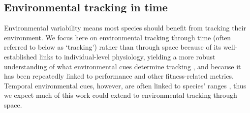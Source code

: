 \documentclass[11pt,letterpaper]{article}
\begin{document}

\subsection{Environmental tracking in time}

Environmental variability means most species should benefit from tracking their environment. We focus here on environmental tracking through time (often referred to below as `tracking') rather than through space because of its well-established links to individual-level physiology, yielding a more robust understanding of what environmental cues determine tracking \citep{chuineJTB,Chew:2012pd}, and because it has been repeatedly linked to performance and other fitness-related metrics. Temporal environmental cues, however, are often linked to species' ranges \citep{Morin:2008vp,arabid2011}, thus we expect much of this work could extend to environmental tracking through space.  %
\end{document}
